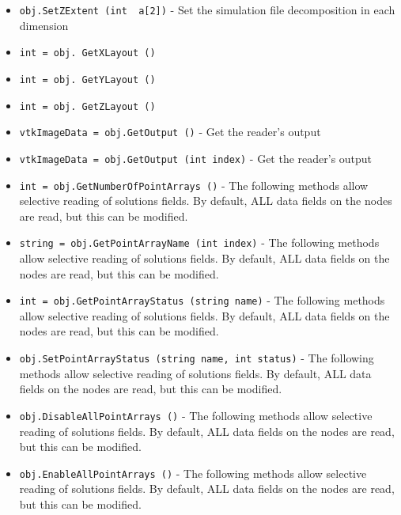 \begin{itemize}
\item  \verb|obj.SetZExtent (int  a[2])| -  Set the simulation file decomposition in each dimension

\item  \verb|int = obj. GetXLayout ()|

\item  \verb|int = obj. GetYLayout ()|

\item  \verb|int = obj. GetZLayout ()|

\item  \verb|vtkImageData = obj.GetOutput ()| -  Get the reader's output

\item  \verb|vtkImageData = obj.GetOutput (int index)| -  Get the reader's output

\item  \verb|int = obj.GetNumberOfPointArrays ()| -  The following methods allow selective reading of solutions fields.
 By default, ALL data fields on the nodes are read, but this can
 be modified.

\item  \verb|string = obj.GetPointArrayName (int index)| -  The following methods allow selective reading of solutions fields.
 By default, ALL data fields on the nodes are read, but this can
 be modified.

\item  \verb|int = obj.GetPointArrayStatus (string name)| -  The following methods allow selective reading of solutions fields.
 By default, ALL data fields on the nodes are read, but this can
 be modified.

\item  \verb|obj.SetPointArrayStatus (string name, int status)| -  The following methods allow selective reading of solutions fields.
 By default, ALL data fields on the nodes are read, but this can
 be modified.

\item  \verb|obj.DisableAllPointArrays ()| -  The following methods allow selective reading of solutions fields.
 By default, ALL data fields on the nodes are read, but this can
 be modified.

\item  \verb|obj.EnableAllPointArrays ()| -  The following methods allow selective reading of solutions fields.
 By default, ALL data fields on the nodes are read, but this can
 be modified.

\end{itemize}
